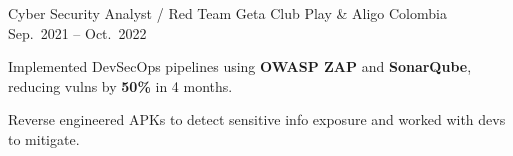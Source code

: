 \begin{cventries}
  \cventry
  {Cyber Security Analyst / Red Team}
  {Geta Club Play \& Aligo}
  {Colombia}
  {Sep.\ 2021 -- Oct.\ 2022}
  {
    \begin{cvitems}
      \item {Implemented DevSecOps pipelines using \textbf{OWASP ZAP} and \textbf{SonarQube}, reducing vulns by \textbf{50\%} in 4 months.}
      \item {Reverse engineered APKs to detect sensitive info exposure and worked with devs to mitigate.}
    \end{cvitems}
  }

\end{cventries}
